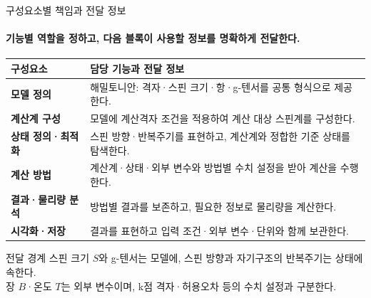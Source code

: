 \begin{frame}[label=boundaries]{구성요소별 책임과 전달 정보}
  \framesubtitle{기능별 역할을 정하고, 다음 블록이 사용할 정보를 명확하게 전달한다.}
  \begin{tabularx}{\textwidth}{@{}p{3.0cm}Y@{}}
    \toprule
    구성요소 & 담당 기능과 전달 정보 \\
    \midrule
    \textbf{모델 정의} & 해밀토니안: 격자·스핀 크기·항·g-텐서를 공통 형식으로 제공한다. \\
    \textbf{계산계 구성} & 모델에 계산격자 조건을 적용하여 계산 대상 스핀계를 구성한다. \\
    \textbf{상태 정의·최적화} & 스핀 방향·반복주기를 표현하고, 계산계와 정합한 기준 상태를 탐색한다. \\
    \textbf{계산 방법} & 계산계·상태·외부 변수와 방법별 수치 설정을 받아 계산을 수행한다. \\
    \textbf{결과·물리량 분석} & 방법별 결과를 보존하고, 필요한 정보로 물리량을 계산한다. \\
    \textbf{시각화·저장} & 결과를 표현하고 입력 조건·외부 변수·단위와 함께 보관한다. \\
    \bottomrule
  \end{tabularx}
  \par\medskip
  \begin{band}{전달 경계}
    스핀 크기 $S$와 g-텐서는 모델에, 스핀 방향과 자기구조의 반복주기는 상태에 속한다.\\
    장 $B$·온도 $T$는 외부 변수이며, k점 격자·허용오차 등의 수치 설정과 구분한다.
  \end{band}
\end{frame}

